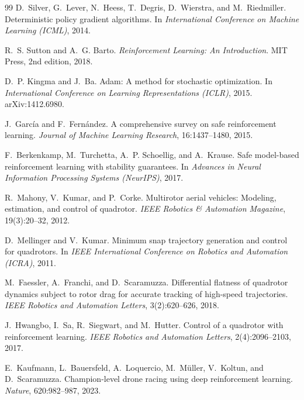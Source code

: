 \documentclass[11pt,a4paper,twoside,openright]{report}
\theoremstyle{plain}
\theoremstyle{definition}
\theoremstyle{remark}
\begin{document}
\begin{thebibliography}{99}
		D.~Silver, G.~Lever, N.~Heess, T.~Degris, D.~Wierstra, and M.~Riedmiller.
		\newblock Deterministic policy gradient algorithms.
		\newblock In \emph{International Conference on Machine Learning (ICML)}, 2014.

		R.~S. Sutton and A.~G. Barto.
		\newblock \emph{Reinforcement Learning: An Introduction}.
		\newblock MIT Press, 2nd edition, 2018.

		D.~P. Kingma and J.~Ba.
		\newblock Adam: A method for stochastic optimization.
		\newblock In \emph{International Conference on Learning Representations (ICLR)},
		2015. arXiv:1412.6980.

		J.~Garc\'ia and F.~Fern\'andez.
		\newblock A comprehensive survey on safe reinforcement learning.
		\newblock \emph{Journal of Machine Learning Research}, 16:1437--1480, 2015.

		F.~Berkenkamp, M.~Turchetta, A.~P. Schoellig, and A.~Krause.
		\newblock Safe model-based reinforcement learning with stability guarantees.
		\newblock In \emph{Advances in Neural Information Processing Systems (NeurIPS)},
		2017.

		R.~Mahony, V.~Kumar, and P.~Corke.
		\newblock Multirotor aerial vehicles: Modeling, estimation, and control of
		quadrotor.
		\newblock \emph{IEEE Robotics \& Automation Magazine}, 19(3):20--32, 2012.

		D.~Mellinger and V.~Kumar.
		\newblock Minimum snap trajectory generation and control for quadrotors.
		\newblock In \emph{IEEE International Conference on Robotics and Automation
			(ICRA)}, 2011.

		M.~Faessler, A.~Franchi, and D.~Scaramuzza.
		\newblock Differential flatness of quadrotor dynamics subject to rotor drag for
		accurate tracking of high-speed trajectories.
		\newblock \emph{IEEE Robotics and Automation Letters}, 3(2):620--626, 2018.

		J.~Hwangbo, I.~Sa, R.~Siegwart, and M.~Hutter.
		\newblock Control of a quadrotor with reinforcement learning.
		\newblock \emph{IEEE Robotics and Automation Letters}, 2(4):2096--2103, 2017.

		E.~Kaufmann, L.~Bauersfeld, A.~Loquercio, M.~M\"uller, V.~Koltun, and
		D.~Scaramuzza.
		\newblock Champion-level drone racing using deep reinforcement learning.
		\newblock \emph{Nature}, 620:982--987, 2023.


\end{thebibliography}
\end{document}
